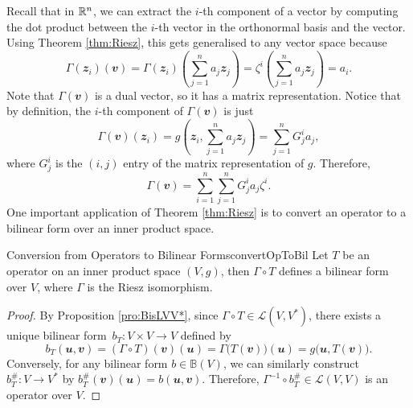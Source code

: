 \documentclass[math]{amznotes}
\theoremstyle{remark}
\begin{document}
    Recall that in $\mathbb{R}^n$, we can extract the $i$-th component of a vector by computing the dot product between the $i$-th vector in the orthonormal basis and the vector. Using Theorem \ref{thm:Riesz}, this gets generalised to any vector space because 
    \begin{equation*}
        \Gamma(\mathbfit{z}_i)(\mathbfit{v}) = \Gamma(\mathbfit{z}_i)\left(\sum_{j = 1}^{n}a_j\mathbfit{z}_j\right) = \zeta^i\left(\sum_{j = 1}^{n}a_j\mathbfit{z}_j\right) = a_i.
    \end{equation*}
    Note that $\Gamma(\mathbfit{v})$ is a dual vector, so it has a matrix representation. Notice that by definition, the $i$-th component of $\Gamma(\mathbfit{v})$ is just 
    \begin{equation*}
        \Gamma(\mathbfit{v})(\mathbfit{z}_i) = g\left(\mathbfit{z}_i, \sum_{j = 1}^{n}a_j\mathbfit{z}_j\right) = \sum_{j = 1}^{n}G^i_ja_j,
    \end{equation*}
    where $G^i_j$ is the $(i, j)$ entry of the matrix representation of $g$. Therefore,
    \begin{equation*}
        \Gamma(\mathbfit{v}) = \sum_{i = 1}^{n}\sum_{j = 1}^{n}G^i_ja_j\zeta^i.
    \end{equation*}
    One important application of Theorem \ref{thm:Riesz} is to convert an operator to a bilinear form over an inner product space.
    \begin{probox}{Conversion from Operators to Bilinear Forms}{convertOpToBil}
        Let $T$ be an operator on an inner product space $(V, g)$, then $\Gamma \circ T$ defines a bilinear form over $V$, where $\Gamma$ is the Riesz isomorphism. 
        \tcblower
        \begin{proof}
            By Proposition \ref{pro:BisLVV*}, since $\Gamma \circ T \in \mathcal{L}\left(V, V^*\right)$, there exists a unique bilinear form~$b_T \colon V \times V \to V$ defined by 
            \begin{equation*}
                b_T(\mathbfit{u}, \mathbfit{v}) = (\Gamma \circ T)(\mathbfit{v})(\mathbfit{u}) = \Gamma\bigl(T(\mathbfit{v})\bigr)(\mathbfit{u}) = g\bigl(\mathbfit{u}, T(\mathbfit{v})\bigr).
            \end{equation*}
            Conversely, for any bilinear form $b \in \mathbb{B}(V)$, we can similarly construct $b^{\#}_T \colon V \to V^*$ by $b^{\#}_T(\mathbfit{v})(\mathbfit{u}) = b(\mathbfit{u}, \mathbfit{v})$. Therefore, $\Gamma^{-1} \circ b^{\#}_T \in \mathcal{L}(V, V)$ is an operator over $V$. 
        \end{proof}
    \end{probox}
\end{document}
